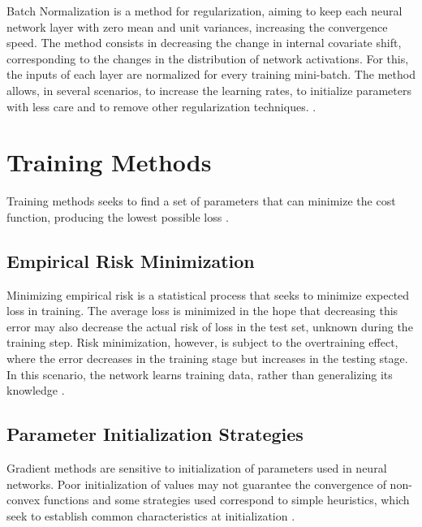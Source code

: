 Batch Normalization is a method for regularization, aiming to keep each neural network layer with zero mean and unit variances,  increasing the convergence speed. 
The method consists in decreasing the change in internal covariate shift, corresponding to the changes in the distribution of network activations.
For this, the inputs of each layer are normalized for every training mini-batch.
The method allows, in several scenarios, to increase the learning rates, to initialize parameters with less care and to remove other regularization techniques. \cite{Ioffe2015:pmlrv37}.

\section{Training Methods}
\label{cap2_met_treinamento}

Training methods seeks to find a set of parameters that can minimize the cost function, producing the lowest possible loss \cite[Ch. 7]{Goodfellow2016}.

\subsection{Empirical Risk Minimization}
\label{cap2_minimiz_risco}

Minimizing empirical risk is a statistical process that seeks to minimize expected loss in training.
The average loss is minimized in the hope that decreasing this error may also decrease the actual risk of loss in the test set, unknown during the training step.
Risk minimization, however, is subject to the overtraining effect, where the error decreases in the training stage but increases in the testing stage.
In this scenario, the network learns training data, rather than generalizing its knowledge \cite[Ch. 7]{Goodfellow2016}.

\subsection{Parameter Initialization Strategies}
\label{cap2_inic_parametros}

Gradient methods are sensitive to initialization of parameters used in neural networks.
Poor initialization of values may not guarantee the convergence of non-convex functions and some strategies used correspond to simple heuristics, which seek to establish common characteristics at initialization \cite[Ch. 7]{Goodfellow2016}.

